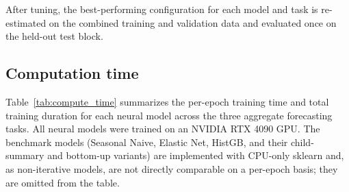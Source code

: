 \documentclass[12pt]{article}
\begin{document}
After tuning, the best-performing configuration for each model and task is re-estimated on the combined training and validation data and evaluated once on the held-out test block.

\subsection{Computation time}

Table~\ref{tab:compute_time} summarizes the per-epoch training time and total training duration for each neural model across the three aggregate forecasting tasks. All neural models were trained on an NVIDIA RTX 4090 GPU. The benchmark models (Seasonal Naive, Elastic Net, HistGB, and their child-summary and bottom-up variants) are implemented with CPU-only sklearn and, as non-iterative models, are not directly comparable on a per-epoch basis; they are omitted from the table.
\end{document}

